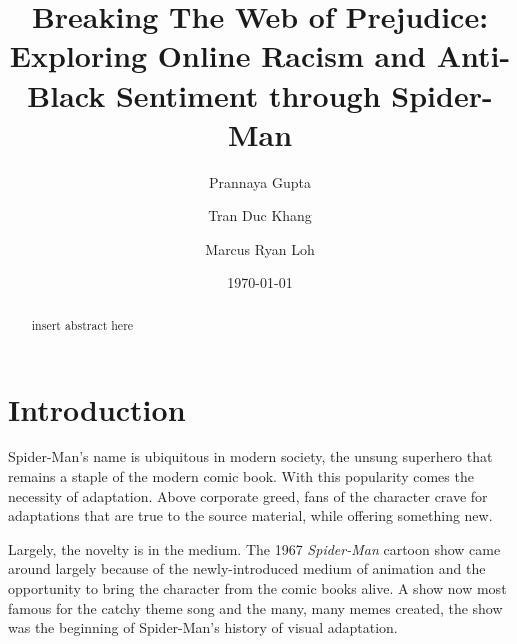 \documentclass[%
 reprint,
 amsmath,amssymb,
 aps,
]{revtex4-2}
\begin{document}

\title{Breaking The Web of Prejudice: Exploring Online Racism and Anti-Black Sentiment through Spider-Man}%

\author{Prannaya Gupta}%
\author{Tran Duc Khang}%
\author{Marcus Ryan Loh}%
 
%




\date{\today}%

\begin{abstract}
insert abstract here
\end{abstract}

\maketitle


\section{\label{sec:introduction}Introduction}

Spider-Man's name is ubiquitous in modern society, the unsung superhero that remains a staple of the modern comic book. With this popularity comes the necessity of adaptation. Above corporate greed, fans of the character crave for adaptations that are true to the source material, while offering something new. 

Largely, the novelty is in the medium. The 1967 \emph{Spider-Man} cartoon show came around largely because of the newly-introduced medium of animation and the opportunity to bring the character from the comic books alive. A show now most famous for the catchy theme song and the many, many memes created, the show was the beginning of Spider-Man's history of visual adaptation.
\end{document}
